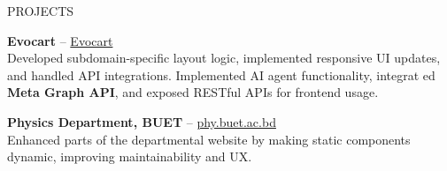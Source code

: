 \documentclass{resume} %
\begin{document}
\begin{rSection}{PROJECTS}
\item \textbf{Evocart} – \href{https://apple.nazarahnaturals.com/}{Evocart} \\
Developed subdomain-specific layout logic, implemented responsive UI updates, and handled API integrations.
Implemented AI agent functionality, integrat ed \textbf{Meta Graph API}, and exposed RESTful APIs for frontend usage.



\item \textbf{Physics Department, BUET} – \href{https://phy.buet.ac.bd/}{phy.buet.ac.bd} \\
Enhanced parts of the departmental website by making static components dynamic, improving maintainability and UX.
\end{rSection}


\end{document}
